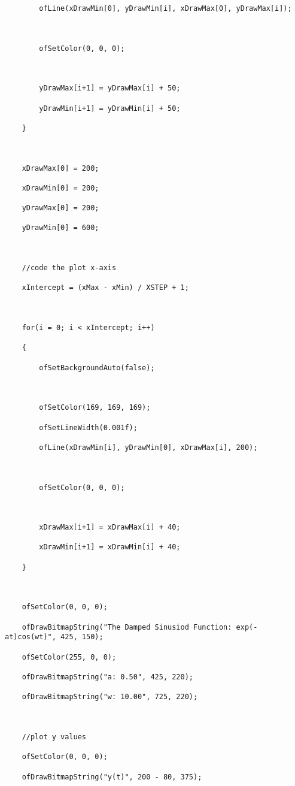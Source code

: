 \documentclass[letterpaper, 24pt, final, onecolumn, titlepage] {article}
\begin{document}
\begin{lstlisting}
        ofLine(xDrawMin[0], yDrawMin[i], xDrawMax[0], yDrawMax[i]);



        ofSetColor(0, 0, 0);



        yDrawMax[i+1] = yDrawMax[i] + 50;

        yDrawMin[i+1] = yDrawMin[i] + 50;

    }



    xDrawMax[0] = 200;

    xDrawMin[0] = 200;

    yDrawMax[0] = 200;

    yDrawMin[0] = 600;



    //code the plot x-axis

    xIntercept = (xMax - xMin) / XSTEP + 1;



    for(i = 0; i < xIntercept; i++)

    {

        ofSetBackgroundAuto(false);



        ofSetColor(169, 169, 169);

        ofSetLineWidth(0.001f);

        ofLine(xDrawMin[i], yDrawMin[0], xDrawMax[i], 200);



        ofSetColor(0, 0, 0);



        xDrawMax[i+1] = xDrawMax[i] + 40;

        xDrawMin[i+1] = xDrawMin[i] + 40;

    }



    ofSetColor(0, 0, 0);

    ofDrawBitmapString("The Damped Sinusiod Function: exp(-at)cos(wt)", 425, 150);

    ofSetColor(255, 0, 0);

    ofDrawBitmapString("a: 0.50", 425, 220);

    ofDrawBitmapString("w: 10.00", 725, 220);



    //plot y values

    ofSetColor(0, 0, 0);

    ofDrawBitmapString("y(t)", 200 - 80, 375);




\end{lstlisting}
\end{document}
